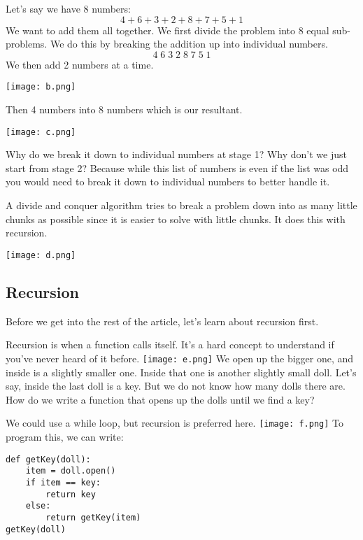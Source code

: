 \documentclass{article}
\begin{document}
Let’s say we have 8 numbers:
$$4 + 6 + 3 + 2 + 8 + 7 + 5 + 1$$
We want to add them all together. We first divide the problem into 8 equal sub-problems. We do this by breaking the addition up into individual numbers.
$$4 \;6 \;3 \;2 \;8 \;7 \;5 \;1$$
We then add 2 numbers at a time.
\begin{center}
\texttt{[image: b.png]}
\end{center}
Then 4 numbers into 8 numbers which is our resultant.
\begin{center}
\texttt{[image: c.png]}
\end{center}
Why do we break it down to individual numbers at stage 1? Why don't we just start from stage 2? Because while this list of numbers is even if the list was odd you would need to break it down to individual numbers to better handle it.

A divide and conquer algorithm tries to break a problem down into as many little chunks as possible since it is easier to solve with little chunks. It does this with recursion.

\texttt{[image: d.png]}

\newpage
\subsection{Recursion}
Before we get into the rest of the article, let's learn about recursion first.

Recursion is when a function calls itself. It's a hard concept to understand if you've never heard of it before.
\texttt{[image: e.png]}
We open up the bigger one, and inside is a slightly smaller one. Inside that one is another slightly small doll. Let's say, inside the last doll is a key. But we do not know how many dolls there are. How do we write a function that opens up the dolls until we find a key?

We could use a while loop, but recursion is preferred here.
\texttt{[image: f.png]}
To program this, we can write:
\begin{verbatim}
def getKey(doll):
	item = doll.open()
    if item == key:
    	return key
	else:
    	return getKey(item)
getKey(doll)
\end{verbatim}
\end{document}
